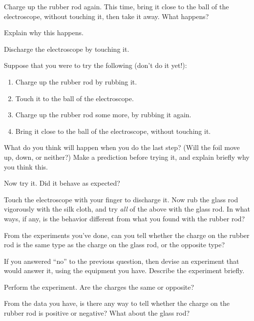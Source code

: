 \documentclass{article}
\begin{document}
Charge up the rubber rod again. This time, bring it close to the
ball of the electroscope, without touching it, then take it away.
What happens?

\vskip 1in

Explain why this happens.

\vskip 1in


Discharge the electroscope by touching it.

Suppose that you were to try the following (don't do it yet!):

\begin{enumerate}
\item Charge up the rubber rod by rubbing it.
\item Touch it to the ball of the electroscope.
\item Charge up the rubber rod some more, by rubbing it again.
\item Bring it close to the ball of the electroscope, without
touching it.
\end{enumerate}
What do you think will happen when you do the last step? (Will the
foil move up, down, or neither?) Make a prediction before trying it,
and explain briefly why you think this.

\vskip 2in

Now try it. Did it behave as expected?

\vskip 1in

Touch the electroscope with your finger to discharge it. Now rub the glass
rod vigorously with the silk cloth, and try \textit{all} of the 
above with the glass rod. In what ways, if any, is the behavior different
from what you found with the rubber rod?

\vskip 2in

From the experiments you've done, can you tell whether the charge on
the rubber rod is the same type as the charge on the glass rod, or
the opposite type?

\vskip 1in

If you answered ``no'' to the previous question, then devise an experiment
that would answer it, using the equipment you have. Describe 
the experiment briefly.

\vskip 2in

Perform the experiment. Are the charges the same or opposite?

\vskip 1in

From the data you have, is there any way to tell whether the charge
on the rubber rod is positive or negative? What about the glass rod?
\end{document}
